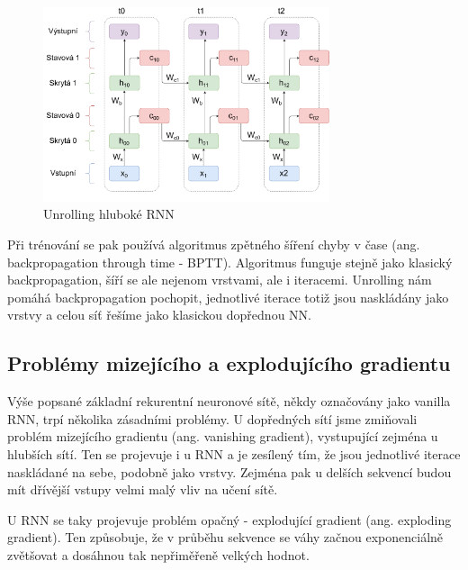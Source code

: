 \begin{figure}[]
    \centering
    \includegraphics[width=0.75\textwidth]{Figures/BPTT.pdf}
    \caption{Unrolling hluboké RNN}
    \label{fig:bptt}
\end{figure}

Při trénování se pak používá algoritmus zpětného šíření chyby v čase (ang.
backpropagation through time - BPTT). Algoritmus funguje stejně jako klasický
backpropagation, šíří se ale nejenom vrstvami, ale i iteracemi. Unrolling nám
pomáhá backpropagation pochopit, jednotlivé iterace totiž jsou naskládány jako
vrstvy a celou síť řešíme jako klasickou dopřednou NN.

\subsection{Problémy mizejícího a explodujícího gradientu}

Výše popsané základní rekurentní neuronové sítě, někdy označovány jako vanilla
RNN, trpí několika zásadními problémy. U dopředných sítí jsme zmiňovali problém
mizejícího gradientu (ang. vanishing gradient), vystupující zejména u hlubších
sítí. Ten se projevuje i u RNN a je zesílený tím, že jsou jednotlivé iterace
naskládané na sebe, podobně jako vrstvy. Zejména pak u delších sekvencí budou
mít dřívější vstupy velmi malý vliv na učení sítě.

U RNN se taky projevuje problém opačný - explodující gradient (ang. exploding
gradient). Ten způsobuje, že v průběhu sekvence se váhy začnou exponenciálně
zvětšovat a dosáhnou tak nepřiměřeně velkých hodnot.

